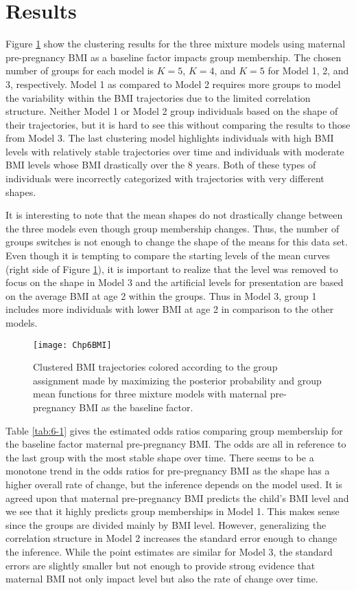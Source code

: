 \section{Results}
Figure \ref{fig:6-1} show the clustering results for the three mixture models using maternal pre-pregnancy BMI as a baseline factor impacts group membership. The chosen number of groups for each model is $K = 5$, $K=4$, and $K=5$ for Model 1, 2, and 3, respectively. Model 1 as compared to Model 2 requires more groups to model the variability within the BMI trajectories due to the limited correlation structure. Neither Model 1 or Model 2 group individuals based on the shape of their trajectories, but it is hard to see this without comparing the results to those from Model 3. The last clustering model highlights individuals with high BMI levels with relatively stable trajectories over time and individuals with moderate BMI levels whose BMI drastically over the 8 years. Both of these types of individuals were incorrectly categorized with trajectories with very different shapes.

It is interesting to note that the mean shapes do not drastically change between the three models even though group membership changes. Thus, the number of groups switches is not enough to change the shape of the means for this data set. Even though it is tempting to compare the starting levels of the mean curves (right side of Figure \ref{fig:6-1}), it is important to realize that the level was removed to focus on the shape in Model 3 and the artificial levels for presentation are based on the average BMI at age 2 within the groups. Thus in Model 3, group 1 includes more individuals with lower BMI at age 2 in comparison to the other models. 

\begin{figure}[h]
\begin{center}
\texttt{[image: Chp6BMI]}
\end{center}
\label{fig:6-1}
\caption{Clustered BMI trajectories colored according to the group assignment made by maximizing the posterior probability and group mean functions for three mixture models with maternal pre-pregnancy BMI as the baseline factor.}
\end{figure}

Table \ref{tab:6-1} gives the estimated odds ratios comparing group membership for the baseline factor maternal pre-pregnancy BMI. The odds are all in reference to the last group with the most stable shape over time. There seems to be a monotone trend in the odds ratios for pre-pregnancy BMI as the shape has a higher overall rate of change, but the inference depends on the model used. It is agreed upon that maternal pre-pregnancy BMI predicts the child's BMI level and we see that it highly predicts group memberships in Model 1. This makes sense since the groups are divided mainly by BMI level. However, generalizing the correlation structure in Model 2 increases the standard error enough to change the inference. While the point estimates are similar for Model 3, the standard errors are slightly smaller but not enough to provide strong evidence that maternal BMI not only impact level but also the rate of change over time. 

